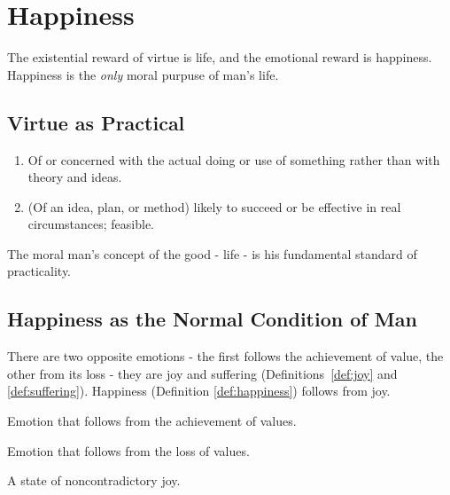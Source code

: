 \chapter{Happiness}

    The existential reward of virtue is life, and the emotional reward is happiness. Happiness is the \textit{only} moral purpuse of man's life.

    \section{Virtue as Practical}

        \begin{definition}[Practical]
        \label{def:practical}
            \begin{enumerate}
                \item Of or concerned with the actual doing or use of something rather than with theory and ideas.
                \item (Of an idea, plan, or method) likely to succeed or be effective in real circumstances; feasible.
            \end{enumerate}
        \end{definition}

        The moral man's concept of the good - life - is his fundamental standard of practicality.

    \section{Happiness as the Normal Condition of Man}

        There are two opposite emotions - the first follows the achievement of value,
            the other from its loss - they are joy and suffering (Definitions~\ref{def:joy} and \ref{def:suffering}).
        Happiness (Definition \ref{def:happiness}) follows from joy.

        \begin{definition}[Joy]
        \label{def:joy}
            Emotion that follows from the achievement of values.
        \end{definition}

        \begin{definition}[Suffering]
        \label{def:suffering}
            Emotion that follows from the loss of values.
        \end{definition}

        \begin{definition}[Happiness]
        \label{def:happiness}
            A state of noncontradictory joy.
        \end{definition}

